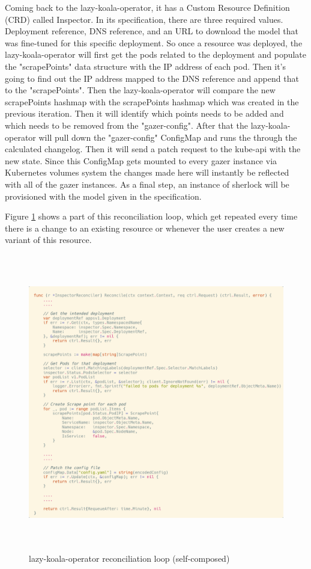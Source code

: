 Coming back to the \ac{lazy-koala-operator}, it has a Custom Resource Definition (CRD) called Inspector. In its specification, there are three required values. Deployment reference, DNS reference, and an URL to download the model that was fine-tuned for this specific deployment. So once a resource was deployed, the \ac{lazy-koala-operator} will first get the pods related to the deployment and populate the "scrapePoints" data structure with the IP address of each pod. Then it's going to find out the IP address mapped to the DNS reference and append that to the "scrapePoints". Then the \ac{lazy-koala-operator} will compare the new scrapePoints hashmap with the scrapePoints hashmap which was created in the previous iteration. Then it will identify which points needs to be added and which needs to be removed from the "gazer-config". After that the \ac{lazy-koala-operator} will pull down the "gazer-config" ConfigMap and runs the through the calculated changelog. Then it will send a patch request to the kube-api with the new state. Since this ConfigMap gets mounted to every \ac{gazer} instance via Kubernetes volumes system the changes made here will instantly be reflected with all of the \ac{gazer} instances. As a final step, an instance of \ac{sherlock} will be provisioned with the model given in the specification.

Figure \ref{fig:reconcile-loop} shows a part of this reconciliation loop, which get repeated every time there is a change to an existing resource or whenever the user creates a new variant of this resource.

\begin{figure}[H]
    \includegraphics[height=13cm]{assets/implementation/reconcile-loop.png}
    \caption{\ac{lazy-koala-operator} reconciliation loop (self-composed)}
    \label{fig:reconcile-loop}
\end{figure}



